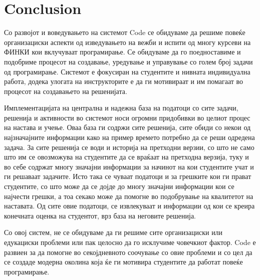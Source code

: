 \documentclass[a4paper,twocolumn]{article}
\begin{document}
\section{Conclusion} 

Со развојот и воведувањето на системот Code се обидуваме да решиме повеќе
организациски аспекти од изведувањето на вежби и испити од многу курсеви на
ФИНКИ кои вклучуваат програмирање. Се обидуваме да го поедноставиме и подобриме
процесот на создавање, уредување и управување со голем број задачи од
програмирање. Системот е фокусиран на студентите и нивната индивидуална работа,
додека улогата на инструкторите е да ги мотивираат и им помагаат во процесот на
создавањето на решенијата.

Имплементацијата на централна и надежна база на податоци со сите задачи,
решенија и активности во системот носи огромни придобивки во целиот процес на
настава и учење. Оваа база ги содржи сите решенија, сите обиди со некои од
најзначајните информации како на пример времето потребно да се реши одредена
задача. За сите решенија се води и историја на претходни верзии, со што не само
што им се овозможува на студентите да се враќаат на претходна верзија, туку и во
себе содржат многу значајни информации за начинот на кои студентите учат и ги
решаваат задачите. Исто така се чуваат податоци и за грешките кои ги прават
студентите, со што може да се дојде до многу значајни информации кои се најчести
грешки, а тоа секако може да помогне во подобрување на квалитетот на наставата.
Од сите овие податоци, се извлекуваат и информации од кои се креира конечната
оценка на студентот, врз база на неговите решенија.

Со овој систем, не се обидуваме да ги решиме сите организациски или едукациски
проблеми или пак целосно да го исклучиме човечкиот фактор. Code е развиен за да
помогне во секојдневното соочување со овие проблеми и со цел да се создаде
модерна околина која ќе ги мотивира студентите да работат повеќе програмирање.




\end{document}
